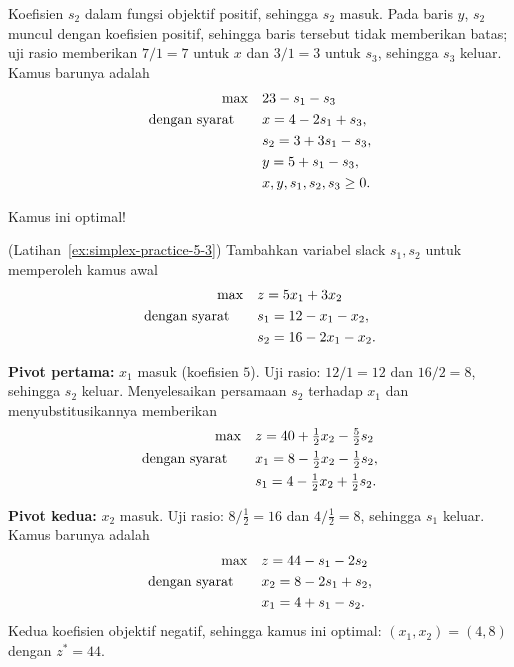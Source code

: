 \begin{solution}
Koefisien \(s_2\) dalam fungsi objektif positif, sehingga \(s_2\) masuk. Pada baris \(y\), \(s_2\) muncul dengan koefisien positif, sehingga baris tersebut tidak memberikan batas; uji rasio memberikan \(7/1 = 7\) untuk \(x\) dan \(3/1 = 3\) untuk \(s_3\), sehingga \(s_3\) keluar. Kamus barunya adalah
\[
\begin{aligned}
\max\quad & 23 - s_1 - s_3 \\
\mbox{dengan syarat}\quad\quad & x = 4 - 2s_1 + s_3, \\
                        & s_2 = 3 + 3s_1 - s_3, \\
                        & y = 5 + s_1 - s_3, \\
                        & x, y, s_1, s_2, s_3 \ge 0.
\end{aligned}
\]

Kamus ini optimal!

\end{solution}

\begin{solution}(Latihan~\ref{ex:simplex-practice-5-3})
Tambahkan variabel slack $s_1, s_2$ untuk memperoleh kamus awal
\[
\begin{aligned}
\max\quad & z = 5x_1 + 3x_2 \\
\mbox{dengan syarat}\quad\quad & s_1 = 12 - x_1 - x_2, \\
         & s_2 = 16 - 2x_1 - x_2.
\end{aligned}
\]

\textbf{Pivot pertama:} $x_1$ masuk (koefisien $5$). Uji rasio: $12/1 = 12$ dan $16/2 = 8$, sehingga $s_2$ keluar. Menyelesaikan persamaan $s_2$ terhadap $x_1$ dan menyubstitusikannya memberikan
\[
\begin{aligned}
\max\quad & z = 40 + \tfrac12 x_2 - \tfrac52 s_2 \\
\mbox{dengan syarat}\quad\quad & x_1 = 8 - \tfrac12 x_2 - \tfrac12 s_2, \\
         & s_1 = 4 - \tfrac12 x_2 + \tfrac12 s_2.
\end{aligned}
\]

\textbf{Pivot kedua:} $x_2$ masuk. Uji rasio: $8/\tfrac12 = 16$ dan $4/\tfrac12 = 8$, sehingga $s_1$ keluar. Kamus barunya adalah
\[
\begin{aligned}
\max\quad & z = 44 - s_1 - 2s_2 \\
\mbox{dengan syarat}\quad\quad & x_2 = 8 - 2s_1 + s_2, \\
         & x_1 = 4 + s_1 - s_2.
\end{aligned}
\]
Kedua koefisien objektif negatif, sehingga kamus ini optimal: $(x_1, x_2) = (4, 8)$ dengan $z^* = 44$.
\end{solution}
\vspace{1cm}

